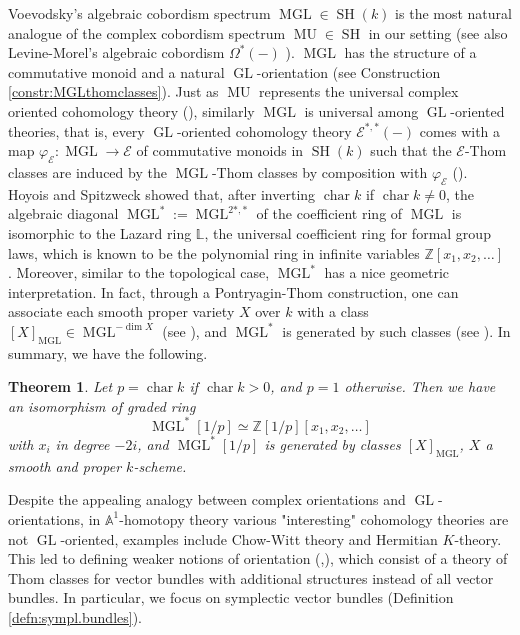 \documentclass[10pt]{amsart}
\theoremstyle{definition}
\theoremstyle{plain}
\newtheorem{introthm}{Theorem}
\numberwithin{equation}{section}
\newcommand{\0}{\emptyset}
\newcommand{\sE}{{\mathcal E}}
\newcommand{\A}{{\mathbb A}}
\renewcommand{\L}{{\mathbb L}}
\newcommand{\Z}{{\mathbb Z}}
\newcommand{\MGL}{{\operatorname{MGL}}}
\newcommand{\GL}{{\operatorname{GL}}}
\newcommand{\SH}{{\operatorname{SH}}}
\renewcommand{\dim}{{\operatorname{dim}}}
\newcommand{\chr}{{\operatorname{char}}}
\newcommand{\MU}{{\operatorname{MU}}}
\begin{document}
Voevodsky's algebraic cobordism spectrum $\MGL \in \SH(k)$ \cite[Section 6.3]{voe:homotopy_theory} is the most natural analogue of the complex cobordism spectrum $\MU \in \SH$ \cite[Chapter 1, Section 5]{C-F:Cobordism} in our setting (see also Levine-Morel's algebraic cobordism $\Omega^*(-)$ \cite{LevMor:Cob}). $\MGL$ has the structure of a commutative monoid \cite[Section 3]{Vezzosi:B.P.} and a natural $\GL$-orientation (see Construction \ref{constr:MGLthomclasses}). Just as $\MU$ represents the universal complex oriented cohomology theory (\cite[Lemma 4.1.13]{ravenel:cobordism}), similarly $\MGL$ is universal among $\GL$-oriented theories, that is, every $\GL$-oriented cohomology theory $\sE^{*,*}(-)$ comes with a map $\varphi_\sE: \MGL\to \sE$ of commutative monoids in $\SH(k)$ such that the $\sE$-Thom classes are induced by the $\MGL$-Thom classes by composition with $\varphi_\sE$ (\cite[Theorem 2.7]{Panin:algcob}). Hoyois \cite{Hoyois:AlgCob} and Spitzweck \cite{Spitzweck:AlgCob} showed that, after inverting $\chr k$ if $\chr k \neq 0$, the algebraic diagonal $\MGL^*:=\MGL^{2*,*}$ of the coefficient ring of $\MGL$ is isomorphic to the Lazard ring $\L$, the universal coefficient ring for formal group laws, which is known to be the polynomial ring in infinite variables $\Z[x_1,x_2,\ldots]$ \cite[Part II, Theorem 7.1]{Adams:homotopy}. Moreover, similar to the topological case, $\MGL^*$ has a nice geometric interpretation. In fact, through a Pontryagin-Thom construction, one can associate each smooth proper variety $X$ over $k$ with a class $[X]_\MGL \in \MGL^{-\dim X}$ (see \cite[Definition 3.1]{lev:ellcoh}), and $\MGL^*$ is generated by such classes (see \cite[Theorem 3.4 (4)]{lev:ellcoh}). In summary, we have the following.

\begin{introthm}
\label{introthm:MGL*}
    Let $p=\chr k$ if $\chr k>0$, and $p=1$ otherwise. Then we have an isomorphism of graded ring
    $$\MGL^*[1/p]\simeq \Z[1/p][x_1,x_2, \ldots]$$
    with $x_i$ in degree $-2i$, and $\MGL^*[1/p]$ is generated by classes $[X]_\MGL$,   $X$ a smooth and proper $k$-scheme.
\end{introthm}

Despite the appealing analogy between complex orientations and $\GL$-orientations, in $\A^1$-homotopy theory various "interesting" cohomology theories are not $\GL$-oriented, examples include Chow-Witt theory and Hermitian $K$-theory. This led to defining weaker notions of orientation (\cite[Section 3]{Ana:Slor},\cite[Section 2]{DegFas:Borel}), which consist of a theory of Thom classes for vector bundles with additional structures instead of all vector bundles. In particular, we focus on symplectic vector bundles (Definition \ref{defn:sympl.bundles}).
\end{document}
